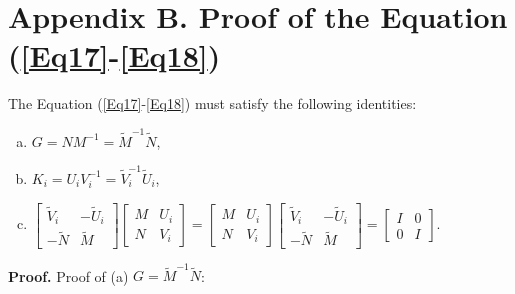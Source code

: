 \documentclass[a4paper,fleqn]{cas-sc}
\begin{document}
\section*{Appendix B. Proof of the Equation (\ref{Eq17}-\ref{Eq18})}
\label{AppendixB}

The Equation (\ref{Eq17}-\ref{Eq18}) must satisfy the following identities:

\begin{enumerate}[(a)]
  \item $G=N M^{-1}=\tilde{M}^{-1} \tilde{N}$,
  \item $K_{i}=U_{i} V_{i}^{-1}=\tilde{V}_{i}^{-1} \tilde{U}_{i}$,
  \item    $ \left[\begin{array}{cc}
              \tilde{V}_{i} & -\tilde{U}_{i} \\
              -\tilde{N}    & \tilde{M}
            \end{array}\right]\left[\begin{array}{cc}
              M & U_{i} \\
              N & V_{i}
            \end{array}\right]=\left[\begin{array}{cc}
              M & U_{i} \\
              N & V_{i}
            \end{array}\right]\left[\begin{array}{cc}
              \tilde{V}_{i} & -\tilde{U}_{i} \\
              -\tilde{N}    & \tilde{M}
            \end{array}\right]=\left[\begin{array}{cc}
              I & 0 \\
              0 & I
            \end{array}\right].$
\end{enumerate}


\textbf{Proof.} Proof of (a) $G=\tilde{M}^{-1} \tilde{N}$:
\end{document}
